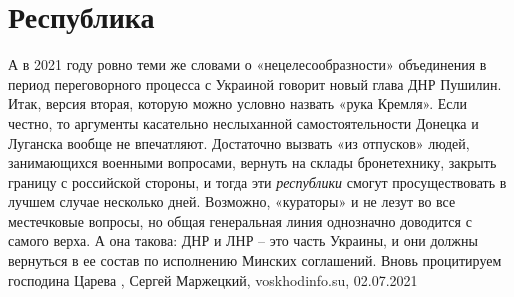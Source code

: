 
 
 
 
 
\chapter{Республика}

А в 2021 году ровно теми же словами о «нецелесообразности» объединения в период
переговорного процесса с Украиной говорит новый глава ДНР Пушилин. Итак, версия
вторая, которую можно условно назвать «рука Кремля». Если честно, то аргументы
касательно неслыханной самостоятельности Донецка и Луганска вообще не
впечатляют. Достаточно вызвать «из отпусков» людей, занимающихся военными
вопросами, вернуть на склады бронетехнику, закрыть границу с российской
стороны, и тогда эти \emph{республики} смогут просуществовать в лучшем случае
несколько дней. Возможно, «кураторы» и не лезут во все местечковые вопросы, но
общая генеральная линия однозначно доводится с самого верха. А она такова: ДНР
и ЛНР – это часть Украины, и они должны вернуться в ее состав по исполнению
Минских соглашений. Вновь процитируем господина Царева
, 
Сергей Маржецкий, voskhodinfo.su, 02.07.2021
